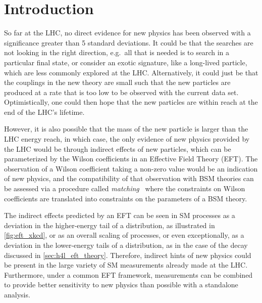 \section{Introduction}
So far at the LHC, no direct evidence for new physics has been observed with a significance greater than 5 standard deviations. It could be that the searches are not looking in the right direction, e.g.\ all that is needed is to search in a particular final state, or consider an exotic signature, like a long-lived particle, which are less commonly explored at the LHC. Alternatively, it could just be that the couplings in the new theory are small such that the new particles are produced at a rate that is too low to be observed with the current data set. Optimistically, one could then hope that the new particles are within reach at the end of the LHC's lifetime. 

However, it is also possible that the mass of the new particle is larger than the LHC energy reach, in which case, the only evidence of new physics provided by the LHC would be through indirect effects of new particles, which can be parameterized by the Wilson coefficients in an Effective Field Theory (EFT). The observation of a Wilson coefficient taking a non-zero value would be an indication of new physics, and the compatibility of that observation with BSM theories can be assessed via a procedure called \textit{matching}~\cite{Carmona:2021xtq} where the constraints on Wilson coefficients are translated into constraints on the parameters of a BSM theory.

The indirect effects predicted by an EFT can be seen in SM processes as a deviation in the higher-energy tail of a distribution, as illustrated in \cref{fig:eft_xkcd}, or as an overall scaling of processes, or even exceptionally, as a deviation in the lower-energy tails of a distribution, as in the case of the \Hfl decay discussed in \cref{sec:h4l_eft_theory}. Therefore, indirect hints of new physics could be present in the large variety of SM measurements already made at the LHC. Furthermore, under a common EFT framework, measurements can be combined to provide better sensitivity to new physics than possible with a standalone analysis.  


